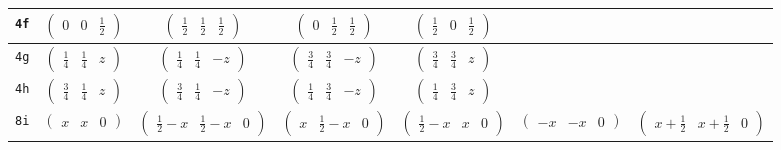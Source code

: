 \documentclass[fleqn,9pt,landscape]{jsarticle}
\begin{document}
\begin{center}
\begin{longtable}{ccccccc}
{\tt 4f} & $ \begin{pmatrix} 0 & 0 & \frac{1}{2} \end{pmatrix} $ & $ \begin{pmatrix} \frac{1}{2} & \frac{1}{2} & \frac{1}{2} \end{pmatrix} $ & $ \begin{pmatrix} 0 & \frac{1}{2} & \frac{1}{2} \end{pmatrix} $ & $ \begin{pmatrix} \frac{1}{2} & 0 & \frac{1}{2} \end{pmatrix} $ & $  $ & $  $ \\ \hline
{\tt 4g} & $ \begin{pmatrix} \frac{1}{4} & \frac{1}{4} & z \end{pmatrix} $ & $ \begin{pmatrix} \frac{1}{4} & \frac{1}{4} & - z \end{pmatrix} $ & $ \begin{pmatrix} \frac{3}{4} & \frac{3}{4} & - z \end{pmatrix} $ & $ \begin{pmatrix} \frac{3}{4} & \frac{3}{4} & z \end{pmatrix} $ & $  $ & $  $ \\ \hline
{\tt 4h} & $ \begin{pmatrix} \frac{3}{4} & \frac{1}{4} & z \end{pmatrix} $ & $ \begin{pmatrix} \frac{3}{4} & \frac{1}{4} & - z \end{pmatrix} $ & $ \begin{pmatrix} \frac{1}{4} & \frac{3}{4} & - z \end{pmatrix} $ & $ \begin{pmatrix} \frac{1}{4} & \frac{3}{4} & z \end{pmatrix} $ & $  $ & $  $ \\ \hline
{\tt 8i} & $ \begin{pmatrix} x & x & 0 \end{pmatrix} $ & $ \begin{pmatrix} \frac{1}{2} - x & \frac{1}{2} - x & 0 \end{pmatrix} $ & $ \begin{pmatrix} x & \frac{1}{2} - x & 0 \end{pmatrix} $ & $ \begin{pmatrix} \frac{1}{2} - x & x & 0 \end{pmatrix} $ & $ \begin{pmatrix} - x & - x & 0 \end{pmatrix} $ & $ \begin{pmatrix} x + \frac{1}{2} & x + \frac{1}{2} & 0 \end{pmatrix} $ \\

\end{longtable}
\end{center}
\end{document}
